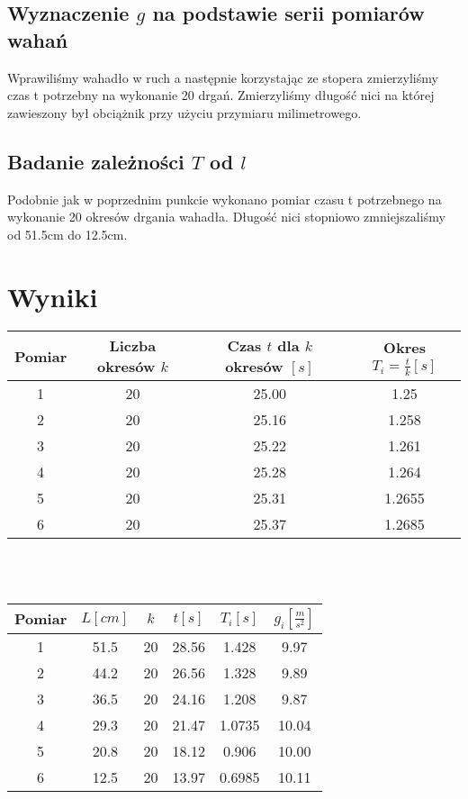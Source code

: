 \documentclass[11pt]{article}
\begin{document}
\subsection{Wyznaczenie $g$ na podstawie serii pomiarów wahań}
Wprawiliśmy wahadło w ruch a następnie korzystając ze stopera zmierzyliśmy czas t potrzebny na wykonanie 20 drgań. 
Zmierzyliśmy długość nici na której zawieszony był obciążnik przy użyciu przymiaru milimetrowego.

\subsection{Badanie zależności $T$ od $l$}
Podobnie jak w poprzednim punkcie wykonano pomiar czasu t potrzebnego na wykonanie 20 okresów drgania wahadła. Długość nici stopniowo zmniejszaliśmy od 51.5cm do 12.5cm.

\clearpage
\section{Wyniki}
\begin{minipage}{\linewidth}
\centering
{} \label{tab:title} 
\begin{tabular}{c | c | c | c}
	Pomiar & Liczba okresów $k$ & Czas $t$ dla $k$ okresów $[s]$ & Okres $T_i = \frac{t}{k} [s]$\\ \hline
	1 & 20 & 25.00 & 1.25\\
	2 & 20 & 25.16 & 1.258\\
	3 & 20 & 25.22 & 1.261\\
	4 & 20 & 25.28 & 1.264\\
	5 & 20 & 25.31 & 1.2655\\
	6 & 20 & 25.37 & 1.2685\\
\end{tabular}\par
\end{minipage}
\\
\\
\begin{minipage}{\linewidth}
\centering
{} \label{tab:title} 
\begin{tabular}{c | c | c | c | c | c}
	Pomiar & $L [cm]$ & $k$  & $t [s]$ & $T_i [s] $ & $g_i [\frac{m}{s^2}]$\\ \hline
	1 & 51.5 & 20 & 28.56 & 1.428 & 9.97\\
	2 & 44.2 & 20 & 26.56 & 1.328 & 9.89\\
	3 & 36.5 & 20 & 24.16 & 1.208 & 9.87\\
	4 & 29.3 & 20 & 21.47 & 1.0735 & 10.04\\
	5 & 20.8 & 20 & 18.12 & 0.906 & 10.00\\
	6 & 12.5 & 20 & 13.97 & 0.6985 & 10.11\\
\end{tabular}\par
\end{minipage}
\end{document}

